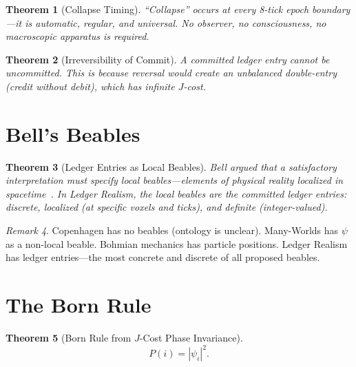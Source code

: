 \documentclass[12pt,a4paper]{article}
\newtheorem{theorem}{Theorem}[section]
\theoremstyle{definition}
\theoremstyle{remark}
\newtheorem{remark}[theorem]{Remark}
\begin{document}
\begin{theorem}[Collapse Timing]
``Collapse'' occurs at every 8-tick epoch boundary---it is
automatic, regular, and universal.  No observer, no consciousness,
no macroscopic apparatus is required.
\end{theorem}

\begin{theorem}[Irreversibility of Commit]
A committed ledger entry cannot be uncommitted.  This is because
reversal would create an unbalanced double-entry (credit without
debit), which has infinite $J$-cost.
\end{theorem}

\section{Bell's Beables}
\label{sec:beables}

\begin{theorem}[Ledger Entries as Local Beables]
Bell argued that a satisfactory interpretation must specify
\emph{local beables}---elements of physical reality localized in
spacetime~\cite{Bell1987}.  In Ledger Realism, the local beables
are the committed ledger entries: discrete, localized (at specific
voxels and ticks), and definite (integer-valued).
\end{theorem}

\begin{remark}
Copenhagen has no beables (ontology is unclear).  Many-Worlds
has $\psi$ as a non-local beable.  Bohmian mechanics has particle
positions.  Ledger Realism has ledger entries---the most concrete
and discrete of all proposed beables.
\end{remark}

\section{The Born Rule}
\label{sec:born}

\begin{theorem}[Born Rule from $J$-Cost Phase Invariance]
\begin{equation}
  \boxed{P(i) = |\psi_i|^2.}
\end{equation}
\end{theorem}
\end{document}

